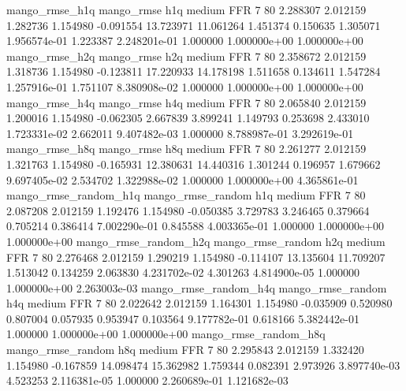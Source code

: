        mango_rmse_h1q        mango_rmse                  h1q     medium      FFR                 7 80  2.288307       2.012159 1.282736       1.154980   -0.091554     13.723971     11.061264     1.451374       0.150635  1.305071 1.956574e-01     1.223387   2.248201e-01            1.000000    1.000000e+00        1.000000e+00
       mango_rmse_h2q        mango_rmse                  h2q     medium      FFR                 7 80  2.358672       2.012159 1.318736       1.154980   -0.123811     17.220933     14.178198     1.511658       0.134611  1.547284 1.257916e-01     1.751107   8.380908e-02            1.000000    1.000000e+00        1.000000e+00
       mango_rmse_h4q        mango_rmse                  h4q     medium      FFR                 7 80  2.065840       2.012159 1.200016       1.154980   -0.062305      2.667839      3.899241     1.149793       0.253698  2.433010 1.723331e-02     2.662011   9.407482e-03            1.000000    8.788987e-01        3.292619e-01
       mango_rmse_h8q        mango_rmse                  h8q     medium      FFR                 7 80  2.261277       2.012159 1.321763       1.154980   -0.165931     12.380631     14.440316     1.301244       0.196957  1.679662 9.697405e-02     2.534702   1.322988e-02            1.000000    1.000000e+00        4.365861e-01
mango_rmse_random_h1q mango_rmse_random                  h1q     medium      FFR                 7 80  2.087208       2.012159 1.192476       1.154980   -0.050385      3.729783      3.246465     0.379664       0.705214  0.386414 7.002290e-01     0.845588   4.003365e-01            1.000000    1.000000e+00        1.000000e+00
mango_rmse_random_h2q mango_rmse_random                  h2q     medium      FFR                 7 80  2.276468       2.012159 1.290219       1.154980   -0.114107     13.135604     11.709207     1.513042       0.134259  2.063830 4.231702e-02     4.301263   4.814900e-05            1.000000    1.000000e+00        2.263003e-03
mango_rmse_random_h4q mango_rmse_random                  h4q     medium      FFR                 7 80  2.022642       2.012159 1.164301       1.154980   -0.035909      0.520980      0.807004     0.057935       0.953947  0.103564 9.177782e-01     0.618166   5.382442e-01            1.000000    1.000000e+00        1.000000e+00
mango_rmse_random_h8q mango_rmse_random                  h8q     medium      FFR                 7 80  2.295843       2.012159 1.332420       1.154980   -0.167859     14.098474     15.362982     1.759344       0.082391  2.973926 3.897740e-03     4.523253   2.116381e-05            1.000000    2.260689e-01        1.121682e-03
